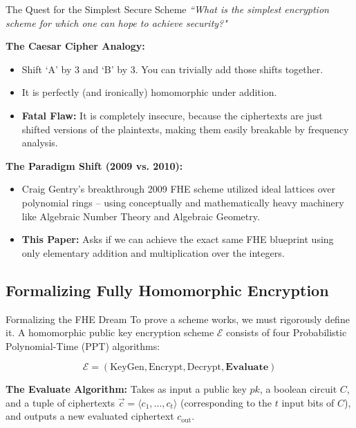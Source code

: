 \documentclass[10pt]{beamer}
\begin{document}
\begin{frame}{The Quest for the Simplest Secure Scheme}
    \textit{``What is the simplest encryption scheme for which one can hope to achieve security?"}
    \pause
    
    \vspace{0.3cm}
    \textbf{The Caesar Cipher Analogy:}
    \begin{itemize}
        \item Shift `A' by 3 and `B' by 3. You can trivially add those shifts together.
        \item It is perfectly (and ironically) homomorphic under addition. 
        \item \textbf{Fatal Flaw:} It is completely insecure, because the ciphertexts are just shifted versions of the plaintexts, making them easily breakable by frequency analysis.
    \end{itemize}
    \pause

    \vspace{0.3cm}
    \textbf{The Paradigm Shift (2009 vs. 2010):}
    \begin{itemize}
        \item Craig Gentry's breakthrough 2009 FHE scheme utilized ideal lattices over polynomial rings -- using conceptually and mathematically heavy machinery like Algebraic Number Theory and Algebraic Geometry.
        \pause
        \item \textbf{This Paper:} Asks if we can achieve the exact same FHE blueprint using only elementary addition and multiplication over the integers. 
    \end{itemize}
\end{frame}

\subsection{Formalizing Fully Homomorphic Encryption}

\begin{frame}{Formalizing the FHE Dream}
    To prove a scheme works, we must rigorously define it. A homomorphic public key encryption scheme $\mathcal{E}$ consists of four Probabilistic Polynomial-Time (PPT) algorithms:
    
    \pause
    $$\mathcal{E} = (\text{KeyGen}, \text{Encrypt}, \text{Decrypt}, \textbf{Evaluate})$$
    
    \vspace{0.3cm}
    \textbf{The Evaluate Algorithm:}
    Takes as input a public key $pk$, a boolean circuit $C$, and a tuple of ciphertexts $\vec{c}=\langle c_{1},...,c_{t}\rangle$ (corresponding to the $t$ input bits of $C$), and outputs a new evaluated ciphertext $c_{\text{out}}$.
\end{frame}
\end{document}
